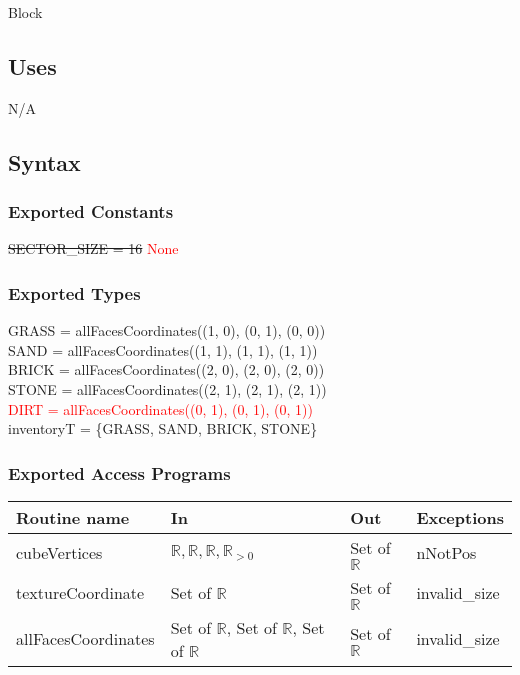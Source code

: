 \documentclass[12pt]{article}
\begin{document}
Block

\subsection* {Uses}

N/A

\subsection* {Syntax}

\subsubsection* {Exported Constants}
\sout{SECTOR\_SIZE = 16}
\textcolor{red}{None}


\subsubsection* {Exported Types}

GRASS = allFacesCoordinates((1, 0), (0, 1), (0, 0)) \\
SAND = allFacesCoordinates((1, 1), (1, 1), (1, 1)) \\
BRICK = allFacesCoordinates((2, 0), (2, 0), (2, 0)) \\
STONE = allFacesCoordinates((2, 1), (2, 1), (2, 1))\\
\textcolor{red}{DIRT = allFacesCoordinates((0, 1), (0, 1), (0, 1))}\\
inventoryT = \{GRASS, SAND, BRICK, STONE\}\\

\subsubsection* {Exported Access Programs}

\begin{tabular}{| l | l | l | l |}
\hline
\textbf{Routine name} & \textbf{In} & \textbf{Out} & \textbf{Exceptions}\\
\hline
cubeVertices & $\mathbb{R}, \mathbb{R}, \mathbb{R}, \mathbb{R}_{>0}$ & Set of $\mathbb{R}$ & nNotPos\\
\hline
textureCoordinate & Set of $\mathbb{R}$ & Set of $\mathbb{R}$ & invalid\_size\\
\hline
allFacesCoordinates & Set of $\mathbb{R}$, Set of $\mathbb{R}$, Set of $\mathbb{R}$ & Set of $\mathbb{R}$ & invalid\_size\\
\hline
\end{tabular}
\end{document}
